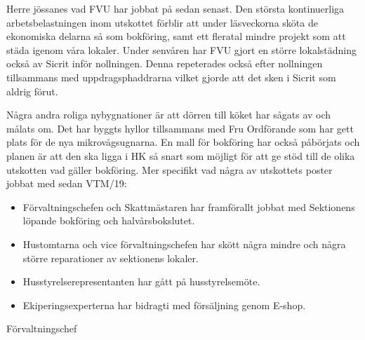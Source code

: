 \documentclass[../_main/handlingar.tex]{subfiles}
\begin{document}
\vspace{8px}

Herre jössanes vad FVU har jobbat på sedan senast. Den största kontinuerliga arbetsbelastningen inom utskottet förblir att under läsveckorna sköta de ekonomiska delarna så som bokföring, samt ett fleratal mindre projekt som att städa igenom våra lokaler. 
Under senvåren har FVU gjort en större lokalstädning också av Sicrit inför nollningen. Denna repeterades också efter nollningen tillsammans med uppdragsphaddrarna vilket gjorde att det sken i Sicrit som aldrig förut.

Några andra roliga nybygnationer är att dörren till köket har sågats av och målats om. 
Det har byggts hyllor tillsammans med Fru Ordförande som har gett plats för de nya mikrovågsugnarna. En mall för bokföring har också påbörjats och planen är att den ska  ligga i HK så snart som möjligt för att ge stöd till de olika utskotten vad gäller bokföring. Mer specifikt vad några av utskottets poster jobbat med sedan VTM/19:

\begin{itemize}
        \item Förvaltningschefen och Skattmästaren har framförallt jobbat med Sektionens löpande bokföring och halvårsbokslutet.
        \item Hustomtarna och vice förvaltningschefen har skött några mindre och några större reparationer av sektionens lokaler.
        \item Husstyrelserepresentanten har gått på husstyrelsemöte.
        \item Ekiperingsexperterna har bidragti med försäljning genom E-shop.
    \end{itemize}

\begin{signatures}{1}
    \mvh
    \signature{Henrik Ramström}{Förvaltningschef}
\end{signatures}
\end{document}
